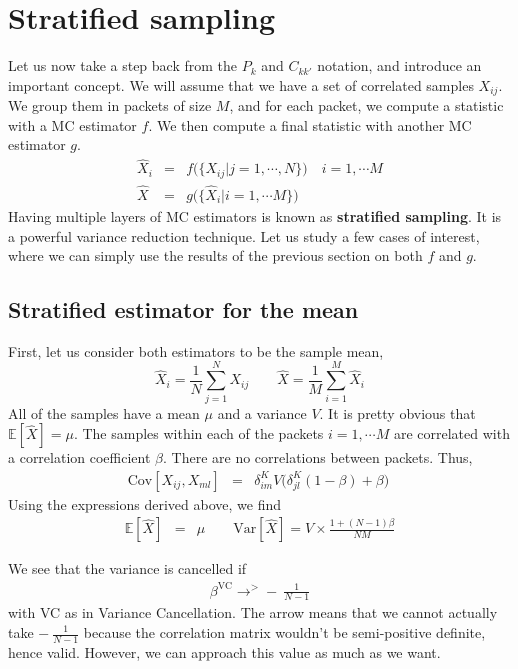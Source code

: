 \documentclass{aastex6}
\newcommand{\equ}[1]{\begin{equation}#1\end{equation}}
\newcommand{\eqn}[1]{\begin{eqnarray}#1\end{eqnarray}}
\begin{document}
\section{Stratified sampling}

Let us now take a step back from the $P_k$ and $C_{kk'}$ notation, and introduce an important concept. 
We will assume that we have a set of correlated samples $X_{ij}$. 
We group them in packets of size $M$, and for each packet, we compute a statistic with a MC estimator $f$. 
We then compute a final statistic with another MC estimator $g$. 
\eqn{
	\hat{X}_i &=& f\bigl(\{X_{ij} | j=1, \cdots, N\}\bigr) \quad i=1, \cdots M \\
	\hat{X} &=& g\bigl(\{\hat{X}_i | i=1, \cdots M\}\bigr)
}
Having multiple layers of MC estimators is known as \textbf{stratified sampling}. It is a powerful variance reduction technique.
Let us study a few cases of interest, where we can simply use the results of the previous section on both $f$ and $g$.

\subsection{Stratified estimator for the mean}

First, let us consider both estimators to be the sample mean,
\equ{
	\hat{X}_i = \frac{1}{N}\sum_{j=1}^N X_{ij}  \quad\quad \hat{X} =  \frac{1}{M}\sum_{i=1}^M \hat{X}_i 
	}
All of the samples have a mean $\mu$ and a variance $V$. It is pretty obvious that $\mathbb{E}[\hat{X}] = \mu$.
The samples within each of the packets $i=1, \cdots M$ are correlated with a correlation coefficient $\beta$. 
There are no correlations between packets. Thus,
\eqn{
	\mathrm{Cov}[X_{ij}, X_{ml}] &=& \delta^K_{im} V \bigl(\delta^K_{jl}(1-\beta) + \beta\bigr) \ 
}
Using the expressions derived above, we find
\eqn{
	\mathbb{E}[\hat{X}] &=& \mu\quad\quad
	\mathrm{Var}[\hat{X}] =  V \times \frac{1 + (N-1)\beta}{N M}
}

We see that the variance is cancelled if 
\eqn{
	\beta^\mathrm{VC} \rightarrow^{>} - \ \frac{1}{N-1}
}
with VC as in Variance Cancellation. The arrow means that we cannot actually take $- \ \frac{1}{N-1}$ because the correlation matrix wouldn't be semi-positive definite, hence valid. However, we can approach this value as much as we want.
\end{document}

